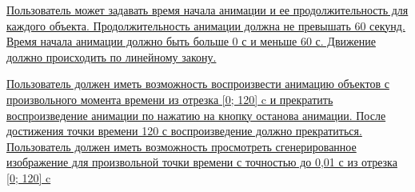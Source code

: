 \uline{\mbox{\hspace*{1.25cm}} Пользователь может задавать время начала анимации и ее продолжительность для каждого объекта. Продолжительность анимации должна не превышать 60 секунд. Время начала анимации должно быть больше 0 с и меньше 60 с. Движение должно происходить по линейному закону.\hfill}


\uline{\mbox{\hspace*{1.25cm}} Пользователь должен иметь возможность воспроизвести анимацию объектов с произвольного момента времени из отрезка [0; 120] c  и прекратить воспроизведение анимации по нажатию на кнопку останова анимации. После достижения точки времени 120 с воспроизведение должно прекратиться. Пользователь должен иметь возможность просмотреть сгенерированное изображение для произвольной точки времени с точностью до 0,01 с из отрезка [0; 120] c \hfill}


\endgroup
\normalsize
